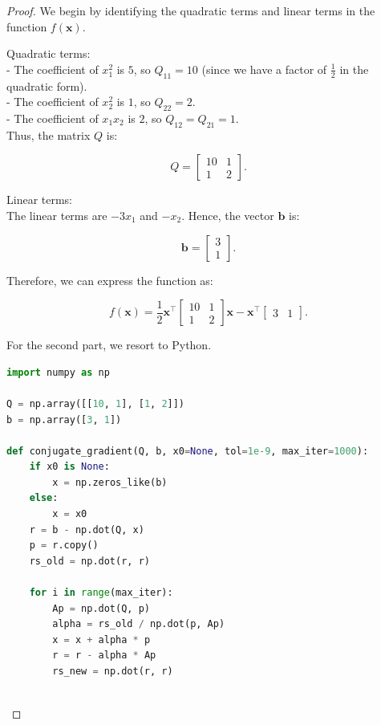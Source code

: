 \documentclass{article}
\begin{document}
\begin{proof}
We begin by identifying the quadratic terms and linear terms in the function \( f(\mathbf{x}) \).

Quadratic terms: \\
- The coefficient of \( x_1^2 \) is \( 5 \), so \( Q_{11} = 10 \) (since we have a factor of \( \frac{1}{2} \) in the quadratic form). \\
- The coefficient of \( x_2^2 \) is \( 1 \), so \( Q_{22} = 2 \). \\
- The coefficient of \( x_1 x_2 \) is \( 2 \), so \( Q_{12} = Q_{21} = 1 \). \\

Thus, the matrix \( Q \) is:

\[
Q = \begin{bmatrix} 10 & 1 \\ 1 & 2 \end{bmatrix}.
\]

Linear terms: \\
The linear terms are \( -3x_1 \) and \( -x_2 \). Hence, the vector \( \mathbf{b} \) is:

\[
\mathbf{b} = \begin{bmatrix} 3 \\ 1 \end{bmatrix}.
\]

Therefore, we can express the function as:

\[
f(\mathbf{x}) = \frac{1}{2} \mathbf{x}^\top \begin{bmatrix} 10 & 1 \\ 1 & 2 \end{bmatrix} \mathbf{x} - \mathbf{x}^\top \begin{bmatrix} 3 & 1 \end{bmatrix}.
\]

For the second part, we resort to Python.

\begin{lstlisting}[language=Python]
import numpy as np

Q = np.array([[10, 1], [1, 2]])
b = np.array([3, 1])

def conjugate_gradient(Q, b, x0=None, tol=1e-9, max_iter=1000):
    if x0 is None:
        x = np.zeros_like(b)  
    else:
        x = x0
    r = b - np.dot(Q, x)  
    p = r.copy()  
    rs_old = np.dot(r, r)
    
    for i in range(max_iter):
        Ap = np.dot(Q, p)
        alpha = rs_old / np.dot(p, Ap)
        x = x + alpha * p
        r = r - alpha * Ap
        rs_new = np.dot(r, r)
        

\end{lstlisting}
\end{proof}
\end{document}
